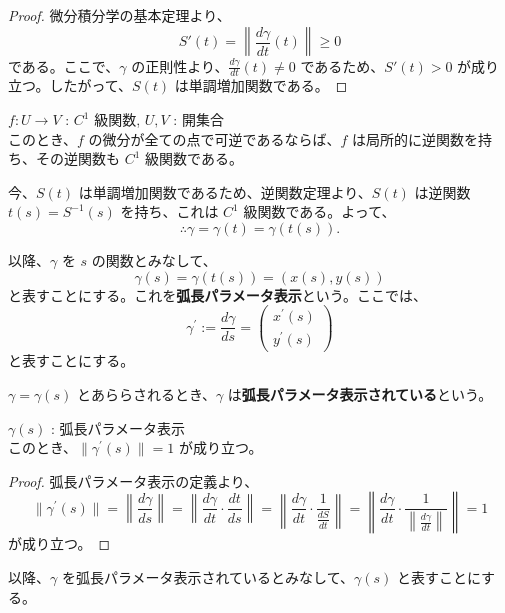 \documentclass[article,paper=a4paper]{jlreq}
\begin{document}
\begin{proof}
    微分積分学の基本定理より、
    \[S'(t) = \left\|\frac{d\gamma}{dt}(t)\right\| \geq 0\]
    である。ここで、$\gamma$ の正則性より、$\frac{d\gamma}{dt}(t) \neq 0$ であるため、$S'(t) > 0$ が成り立つ。したがって、$S(t)$ は単調増加関数である。
\end{proof}


\begin{thm}[逆関数定理]
    \quad $f : U \to V$ : $C^{1}$ 級関数, $U,V$ : 開集合\\
    このとき、$f$ の微分が全ての点で可逆であるならば、$f$ は局所的に逆関数を持ち、その逆関数も $C^{1}$ 級関数である。
\end{thm}

今、$S(t)$ は単調増加関数であるため、逆関数定理より、$S(t)$ は逆関数 $t(s) = S^{-1}(s)$ を持ち、これは $C^{1}$ 級関数である。よって、
\[\therefore \gamma = \gamma(t) = \gamma(t(s)).\]

以降、$\gamma$ を $s$ の関数とみなして、
\[\gamma(s) = \gamma(t(s)) = \left(x(s),y(s)\right)\]
 と表すことにする。これを\textbf{弧長パラメータ表示}という。ここでは、
 \[\gamma^{\prime} := \frac{d\gamma}{ds} = \begin{pmatrix}
    x^{\prime}(s) \\ y^{\prime}(s)
 \end{pmatrix}\]
 と表すことにする。

\begin{rem}
    $\gamma = \gamma(s)$ とあららされるとき、$\gamma$ は\textbf{弧長パラメータ表示されている}という。
\end{rem}

\begin{prop}
    \quad $\gamma(s)$ : 弧長パラメータ表示\\
    このとき、$\|\gamma^{\prime}(s)\| = 1$ が成り立つ。
\end{prop}

\begin{proof}
    弧長パラメータ表示の定義より、
    \[\|\gamma^{\prime}(s)\| = \left\|\frac{d\gamma}{ds}\right\| = \left\|\frac{d\gamma}{dt}\cdot \frac{dt}{ds}\right\| = \left\|\frac{d\gamma}{dt} \cdot \frac{1}{\frac{dS}{dt}}\right\| = \left\|\frac{d\gamma}{dt} \cdot \frac{1}{\left\|\frac{d\gamma}{dt}\right\|} \right\| = 1\]
    が成り立つ。
\end{proof}

以降、$\gamma$ を弧長パラメータ表示されているとみなして、$\gamma(s)$ と表すことにする。
\end{document}
